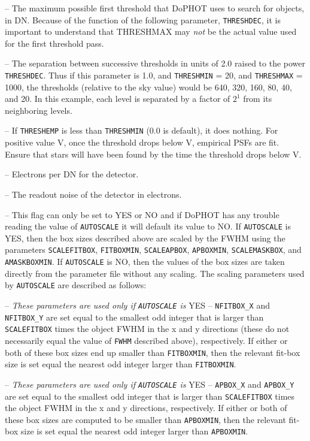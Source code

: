  -- The maximum possible first threshold that
DoPHOT  uses to search for objects, in DN.  
Because of the function of 
the following parameter, {\tt THRESHDEC}, it is important to 
understand that THRESHMAX may {\it not} be the actual value used
for the first threshold pass.

 -- The separation between successive
thresholds in units of 2.0 raised to the power {\tt THRESHDEC}.  Thus if this
parameter is 1.0, and {\tt THRESHMIN} = 20, and {\tt THRESHMAX} = 
1000, the thresholds (relative to the sky value) would be
640, 320, 160, 80, 40, and 20.  In this example, each level is separated by
a factor of $2^1$ from its neighboring levels.

 -- If {\tt THRESHEMP} is less than {\tt THRESHMIN} 
(0.0 is default), it does nothing. For positive 
value V, once the threshold drops below V, empirical PSFs are fit. Ensure
that stars will have been found by the time the threshold drops below V.

 -- Electrons per DN for the 
detector.

 -- The readout noise of the detector in
electrons.

 -- This flag can only be set to 
YES or NO and if DoPHOT has any trouble reading the value of
{\tt AUTOSCALE} it will default its value to NO.  
If {\tt AUTOSCALE} is YES, then the box sizes described above are scaled by 
the FWHM using the parameters {\tt SCALEFITBOX}, {\tt FITBOXMIN},
{\tt SCALEAPBOX}, {\tt APBOXMIN}, {\tt SCALEMASKBOX},  and
{\tt AMASKBOXMIN}.  If {\tt AUTOSCALE} is NO, then the values
of the box sizes are taken directly from the parameter file 
without any scaling.
The scaling parameters used by {\tt AUTOSCALE} are described 
as follows:

 -- 
{\it These parameters are used
only if {\tt AUTOSCALE} is} YES -- 
{\tt NFITBOX\_X} and 
{\tt NFITBOX\_Y} are set equal to the smallest odd integer
that is larger than 
{\tt SCALEFITBOX} times the object FWHM in the x and y
directions (these do not necessarily equal the value
of {\tt FWHM} described above), respectively.  If either or
both of these 
box sizes end up smaller than {\tt FITBOXMIN},
then the relevant fit-box size is set equal the nearest
odd integer larger than {\tt FITBOXMIN}.

 -- 
{\it These parameters are used
only if {\tt AUTOSCALE} is} YES -- 
{\tt APBOX\_X} and 
{\tt APBOX\_Y} are set equal to the smallest odd integer
that is larger than 
{\tt SCALEFITBOX} times the object FWHM in the x and y
directions, respectively.  If either or
both of these 
box sizes are computed to be smaller than {\tt APBOXMIN},
then the relevant fit-box size is set equal the nearest
odd integer larger than {\tt APBOXMIN}.

